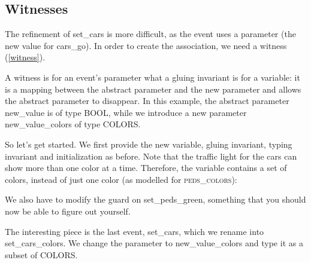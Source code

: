 \subsection{Witnesses}

The refinement of \textsf{set\_cars} is more difficult, as the event uses a parameter (the new value for \textsf{cars\_go}).  In order to create the association, we need a witness (\ref{witness}).

A witness is for an event's parameter what a gluing invariant is for a variable: it is a mapping between the abstract parameter and the new parameter and allows the abstract parameter to disappear.  In this example, the abstract parameter \textsf{new\_value} is of type \textsf{BOOL}, while we introduce a new parameter \textsf{new\_value\_colors} of type \textsf{COLORS}.


So let's get started.  We first provide the new variable, gluing invariant, typing invariant and initialization as before.  Note that the traffic light for the cars can show more than one color at a time.  Therefore, the variable contains a set of colors, instead of just one color (as modelled for \textsc{peds\_colors}):


We also have to modify the guard on \textsf{set\_peds\_green}, something that you should now be able to figure out yourself.

The interesting piece is the last event, \textsf{set\_cars}, which we rename into \textsf{set\_cars\_colors}.  We change the parameter to \textsf{new\_value\_colors} and type it as a subset of \textsf{COLORS}.

